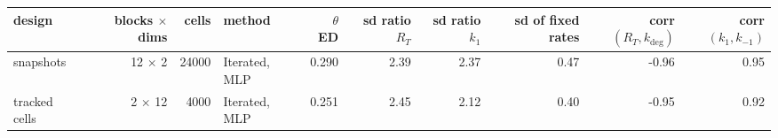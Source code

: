 \begin{tabular}{lrrlrrrrrr}
\toprule
design & blocks $\times$ dims & cells & method & $\theta$ ED & sd ratio $R_T$ & sd ratio $k_1$ & sd of fixed rates & corr$(R_T, k_\mathrm{deg})$ & corr$(k_1, k_{-1})$ \\
\midrule
snapshots & 12 $\times$ 2 & 24000 & Iterated, MLP & 0.290 & 2.39 & 2.37 & 0.47 & -0.96 & 0.95 \\
tracked cells & 2 $\times$ 12 & 4000 & Iterated, MLP & 0.251 & 2.45 & 2.12 & 0.40 & -0.95 & 0.92 \\
\bottomrule
\end{tabular}
